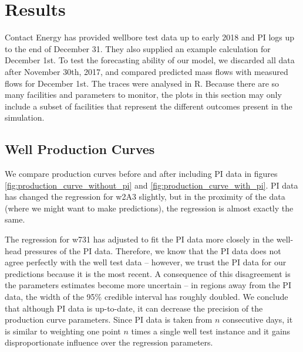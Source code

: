 \documentclass[a4paper, 12pt]{article}
\begin{document}
\section{Results}
Contact Energy has provided wellbore test data up to early 2018 and PI logs up to the end of December 31. They also supplied an example calculation for December 1st. To test the forecasting ability of our model, we discarded all data after November 30th, 2017, and compared predicted mass flows with measured flows for December 1st. The traces were analysed in R. Because there are so many facilities and parameters to monitor, the plots in this section may only include a subset of facilities that represent the different outcomes present in the simulation.

\subsection{Well Production Curves}

We compare production curves before and after including PI data in figures \ref{fig:production_curve_without_pi} and \ref{fig:production_curve_with_pi}. PI data has changed the regression for w2A3 slightly, but in the proximity of the data (where we might want to make predictions), the regression is almost exactly the same.

The regression for w731 has adjusted to fit the PI data more closely in the well-head pressures of the PI data. Therefore, we know that the PI data does not agree perfectly with the well test data -- however, we trust the PI data for our predictions because it is the most recent. A consequence of this disagreement is the parameters estimates become more uncertain -- in regions away from the PI data, the width of the 95\% credible interval has roughly doubled. We conclude that although PI data is up-to-date, it can decrease the precision of the production curve parameters. Since PI data is taken from $n$ consecutive days, it is similar to weighting one point $n$ times a single well test instance and it gains disproportionate influence over the regression parameters.
\end{document}

